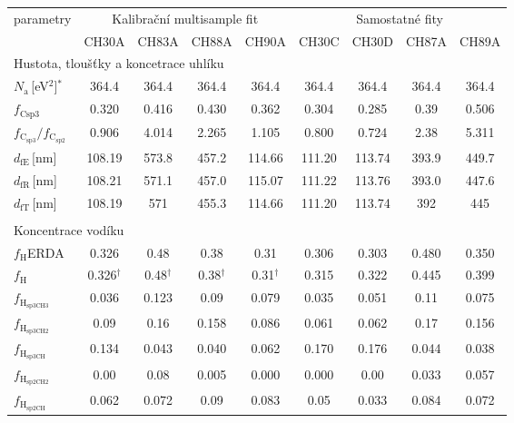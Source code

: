 \begin{tabular}{lcccccccc}
\hline
parametry & \multicolumn{4}{c}{Kalibrační multisample fit} & \multicolumn{4}{c}{Samostatné fity}\\
 & CH30A & CH83A & CH88A & CH90A & CH30C & CH30D & CH87A & CH89A\\
\hline
\multicolumn{9}{l}{Hustota, tloušťky a koncetrace uhlíku}\\
\hline
$N_\mathrm{a}$\,[eV$^2$]$^\ast$ & 364.4 & 364.4 & 364.4 & 364.4 & 364.4 & 364.4 & 364.4 & 364.4\\
$f_\mathrm{Csp3}$ & 0.320 & 0.416 & 0.430 & 0.362 & 0.304 & 0.285 & 0.39 & 0.506\\
$f_\mathrm{C_{sp3}}/f_\mathrm{C_{sp2}}$ & 0.906 & 4.014 & 2.265 & 1.105 & 0.800 & 0.724 & 2.38 & 5.311\\
$d_\mathrm{fE}$\,[nm] & 108.19 & 573.8 & 457.2 & 114.66 & 111.20 & 113.74 & 393.9 & 449.7\\
$d_\mathrm{fR}$\,[nm] & 108.21 & 571.1 & 457.0 & 115.07 & 111.22 & 113.76 & 393.0 & 447.6\\
$d_\mathrm{fT}$\,[nm] & 108.19 & 571 & 455.3 & 114.66 & 111.20 & 113.74 & 392 & 445\\


\multicolumn{9}{l}{}\\
\multicolumn{9}{l}{Koncentrace vodíku}\\
\hline
$f_\mathrm{H}$ERDA & 0.326 & 0.48 & 0.38 & 0.31 & 0.306 & 0.303 & 0.480 & 0.350\\
$f_\mathrm{H}$ & 0.326$^\dagger$ & 0.48$^\dagger$ & 0.38$^\dagger$ & 0.31$^\dagger$ & 0.315 & 0.322 & 0.445 & 0.399\\
$f_\mathrm{H_{sp3CH3}}$ & 0.036 & 0.123 & 0.09 & 0.079 & 0.035 & 0.051 & 0.11 & 0.075\\
$f_\mathrm{H_{sp3CH2}}$ & 0.09 & 0.16 & 0.158 & 0.086 & 0.061 & 0.062 & 0.17 & 0.156\\
$f_\mathrm{H_{sp3CH}}$ & 0.134 & 0.043 & 0.040 & 0.062 & 0.170 & 0.176 & 0.044 & 0.038\\
$f_\mathrm{H_{sp2CH2}}$ & 0.00 & 0.08 & 0.005 & 0.000 & 0.000 & 0.00 & 0.033 & 0.057\\
$f_\mathrm{H_{sp2CH}}$ & 0.062 & 0.072 & 0.09 & 0.083 & 0.05 & 0.033 & 0.084 & 0.072\\



\end{tabular}
